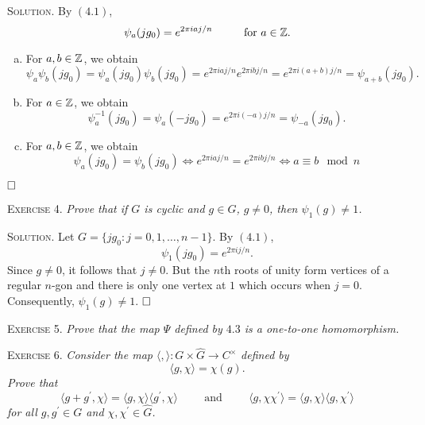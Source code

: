 \documentclass[11pt, leqno]{article}
\newcommand{\done}{\ensuremath{\hfill\square}}
\begin{document}
\textsc{Solution}. By $(4.1)$, 
\begin{displaymath}
\psi_a(jg_0) = e^{2 \pi i aj/n} \hspace{1cm} \text{for } a\in \mathbb{Z}.
\end{displaymath} 
\begin{enumerate}[(a)]
\item For $a, b \in \mathbb{Z}$, we obtain 
\begin{displaymath}
\psi_a\psi_b(jg_0) = \psi_a(jg_0)\psi_b(jg_0) = e^{2 \pi i aj/n} e^{2 \pi i bj/n} = e^{2\pi i (a+b)j/n} = \psi_{a+b}(jg_0).
\end{displaymath} 
\item For $a\in \mathbb{Z}$, we obtain
\begin{displaymath}
\psi_a^{-1}(jg_0) = \psi_a(-jg_0) = e^{2\pi i (-a)j/n} = \psi_{-a}(jg_0).
\end{displaymath} 
\item For $a, b \in \mathbb{Z}$, we obtain 
\begin{displaymath}
\psi_a(jg_0) = \psi_b(jg_0) \iff e^{2\pi i a j/n} = e^{2\pi i bj/n} \iff a \equiv b \mod n
\end{displaymath}
\end{enumerate}
\done

\textsc{Exercise 4}. \emph{Prove that if $G$ is cyclic and $g\in G$, $g\ne 0$, then $\psi_1(g) \ne 1$.}

\textsc{Solution}. Let $G = \{ jg_0 : j = 0, 1, \ldots, n-1 \}$. By $(4.1)$, 
\begin{displaymath}
\psi_1(jg_0) = e^{2\pi i j/n}.
\end{displaymath}
Since $g \ne 0$, it follows that $j\ne 0$. But the $n$th roots of unity form vertices of a regular $n$-gon and there is only one vertex at $1$ which occurs when $j = 0$. Consequently, $\psi_1(g) \ne 1$. \done

\textsc{Exercise 5}. \emph{Prove that the map $\Psi$ defined by $4.3$ is a one-to-one homomorphism.}

\textsc{Exercise 6}. \emph{Consider the map $\langle , \rangle : G \times \widehat{G} \to C^{\times}$ defined by 
\begin{displaymath}
\langle g, \chi \rangle = \chi(g).
\end{displaymath}
Prove that 
\begin{displaymath}
\langle g+g^{\prime}, \chi \rangle = \langle g, \chi \rangle \langle g^{\prime}, \chi \rangle \hspace{1cm} \text{and} \hspace{1cm} \langle g, \chi \chi^{\prime} \rangle = \langle g, \chi \rangle \langle g, \chi^{\prime} \rangle
\end{displaymath}
for all $g, g^{\prime} \in G$ and $\chi, \chi^{\prime} \in \widehat{G}$.}
\end{document}
